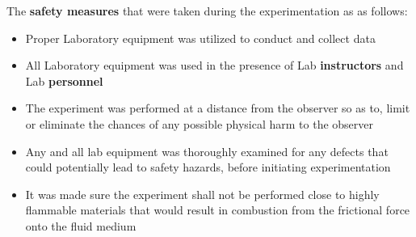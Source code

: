 

{The \textbf{safety measures} that were taken during the experimentation as as follows:}

	\begin{itemize}
		\item {Proper Laboratory equipment was utilized to conduct and collect data}
		\item {All Laboratory equipment was used in the presence of Lab \textbf{instructors} and Lab \textbf{personnel}}
		\item {The experiment was performed at a distance from the observer so as to, limit or eliminate the chances of any possible physical harm to the observer}
		\item {Any and all lab equipment was thoroughly examined for any defects that could potentially lead to safety hazards, before initiating experimentation}
		\item {It was made sure the experiment shall not be performed close to highly flammable materials that would result in combustion from the frictional force onto the fluid medium}
	\end{itemize}

